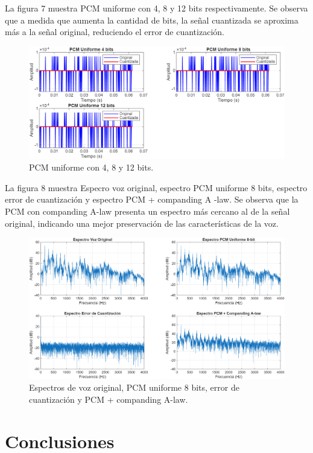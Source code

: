 \documentclass[journal]{IEEEtran} %
\begin{document}
La figura 7 muestra PCM uniforme con 4, 8 y 12 bits respectivamente. Se observa que a medida que aumenta la cantidad de bits, la señal cuantizada se aproxima más a la señal original, reduciendo el error de cuantización.
\begin{figure}[H]
    \centerline{\includegraphics[width=0.8\columnwidth]{Figure_7.png}}
    \caption{PCM uniforme con 4, 8 y 12 bits.}
    \label{fig} 
\end{figure}

La figura 8 muestra Especro voz original, espectro PCM uniforme 8 bits, espectro error de cuantización y espectro PCM + companding A -law. Se observa que la PCM con companding A-law presenta un espectro más cercano al de la señal original, indicando una mejor preservación de las características de la voz.
\begin{figure}[H]
    \centerline{\includegraphics[width=0.8\columnwidth]{Figure_8.png}}
    \caption{Espectros de voz original, PCM uniforme 8 bits, error de cuantización y PCM + companding A-law.}
    \label{fig} 
\end{figure}








\section{Conclusiones}
\end{document}
